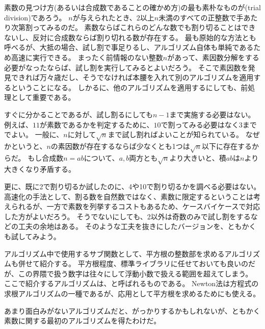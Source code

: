 素数の見つけ方(あるいは合成数であることの確かめ方)の最も素朴なものが(trial division)であろう。
$n$が与えられたとき、$2$以上$n$未満のすべての正整数で手あたり次第割ってみるのだ。
素数ならばこれらのどんな数でも割り切ることはできないし、反対に合成数ならば割り切れる数が存在する。
最も原始的な方法とも呼べるが、大抵の場合、試し割で事足りるし、アルゴリズム自体も単純であるため高速に実行できる。
まったく前情報のない整数$n$があって、素因数分解をする必要がなったならば、試し割を実行してみるとよいだろう。
そこで素因数を発見できれば万々歳だし、そうでなければ本腰を入れて別のアルゴリズムを適用するということになる。
しかるに、他のアルゴリズムを適用するにしても、前処理として重要である。

すぐに分かることであるが、試し割るにしても$n-1$まで実施する必要はない。
例えば、$11$が素数であるかを判定するために、$10$で割ってみる必要はなく$3$まででよい。
一般に、$n$に対して$\sqrt{n}$まで試し割ればよいことが知られている。
なぜかというと、$n$の素因数が存在するならば少なくとも1つは$\sqrt{n}$以下に存在するからだ。
もし合成数$n=ab$について、$a,b$両方とも$\sqrt{n}$より大きいと、積$ab$は$n$より大きくなり矛盾する。

更に、既に2で割り切るか試したのに、4や10で割り切るかを調べる必要はない。
高速化の手法として、割る数を自然数ではなく、素数に限定するということは考えられるが、一方で素数を列挙するコストもあるため、ケースバイケースで対応した方がよいだろう。
そうでないにしても、2以外は奇数のみで試し割をするなどの工夫の余地はある。
そのような工夫を抜きにしたバージョンを、ともかくも試してみよう。


アルゴリズム中で使用するサブ関数として、平方根の整数部を求めるアルゴリズムも併せて紹介する。
平方根程度、標準ライブラリに任せておいても良いのだが、この界隈で扱う数字は往々にして浮動小数で扱える範囲を超えてしまう。
ここで紹介するアルゴリズムは、と呼ばれるものである。
Newton法は方程式の求根アルゴリズムの一種であるが、応用として平方根を求めるためにも使える。


あまり面白みがないアルゴリズムだと、がっかりするかもしれないが、ともかく素数に関する最初のアルゴリズムを得たわけだ。


